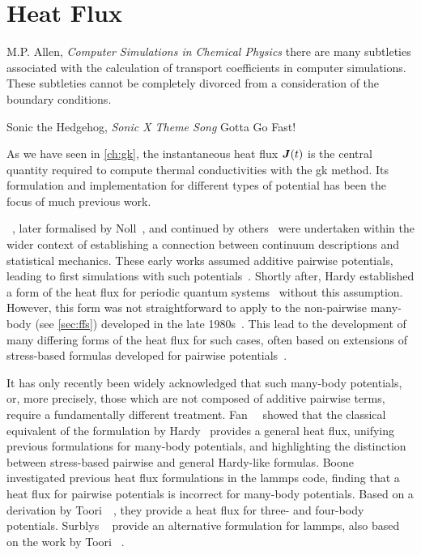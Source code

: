 
\chapter{Heat Flux}
\label{ch:gk-hf}

\begin{chapquote}{M.P. Allen, \textit{Computer Simulations in Chemical Physics}}
	 \el there are many subtleties associated with the calculation of transport coefficients in computer simulations. These subtleties cannot be completely divorced from a consideration of the boundary conditions.
\end{chapquote}

\begin{chapquote}{Sonic the Hedgehog, \textit{Sonic X Theme Song}}
	\noindent
	Gotta Go Fast!
\end{chapquote}

\noindent
As we have seen in \cref{ch:gk}, the instantaneous heat flux $\boldsymbol{J}(t)$ is the central quantity required to compute thermal conductivities with the \gls{gk} method.
Its formulation and implementation for different types of potential has been the focus of much previous work.

~\cite{ik1950t}, later formalised by Noll~\cite{n1955t}, and continued by others~\cite{h1982t,mb1993p,at2010p,fs2015t} were undertaken within the wider context of establishing a connection between continuum descriptions and statistical mechanics.
These early works assumed additive pairwise potentials, leading to first \gk simulations with such potentials~\cite{agw1970t,lvk1973t,lmh1986t}.
Shortly after, Hardy established a form of the heat flux for periodic quantum systems~\cite{h1963t} without this assumption.
However, this form was not straightforward to apply to the non-pairwise many-body \ffs (see \cref{sec:ffs}) developed in the late 1980s~\cite{sw1985p,t1988p,b1990p}.
This lead to the development of many differing forms of the heat flux for such cases, often based on extensions of stress-based formulas developed for pairwise potentials~\cite{vc1999t,c2006t,ggs2010t,fpdh2015t}.

It has only recently been widely acknowledged that such many-body potentials, or, more precisely, those which are not composed of additive pairwise terms, require a fundamentally different treatment.
Fan~\etal~\cite{fpdh2015t} showed that the classical equivalent of the formulation by Hardy~\cite{h1963t} provides a general heat flux, unifying previous formulations for many-body potentials, and highlighting the distinction between stress-based pairwise and general Hardy-like formulas.
Boone \etal~\cite{bbw2019t} investigated previous heat flux formulations in the \gls{lammps} code, finding that a heat flux for pairwise potentials is incorrect for many-body potentials. Based on a derivation by Toori~\etal~\cite{tno2008t}, they provide a heat flux for three- and four-body potentials.
Surblys \etal~\cite{smko2019t} provide an alternative  formulation for \gls{lammps}, also based on the work by Toori \etal~\cite{tno2008t}.


